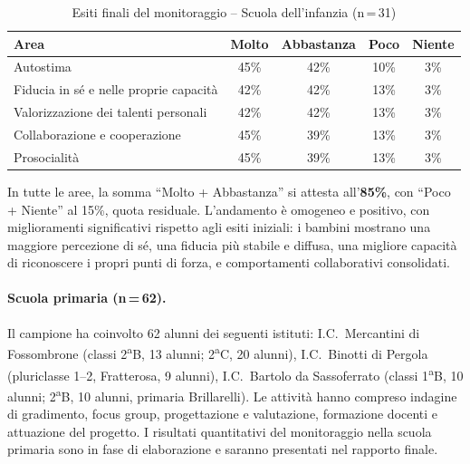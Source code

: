 \documentclass[12pt,a4paper]{article}
\begin{document}
\begin{table}[h]
\centering
\caption{Esiti finali del monitoraggio -- Scuola dell'infanzia (n\,=\,31)}
\label{tab:urbino_infanzia}
\begin{tabular}{lcccc}
\toprule
\textbf{Area} & \textbf{Molto} & \textbf{Abbastanza} & \textbf{Poco} & \textbf{Niente} \\
\midrule
Autostima & 45\% & 42\% & 10\% & 3\% \\
Fiducia in s\'e e nelle proprie capacit\`a & 42\% & 42\% & 13\% & 3\% \\
Valorizzazione dei talenti personali & 42\% & 42\% & 13\% & 3\% \\
Collaborazione e cooperazione & 45\% & 39\% & 13\% & 3\% \\
Prosocialit\`a & 45\% & 39\% & 13\% & 3\% \\
\bottomrule
\end{tabular}
\end{table}

In tutte le aree, la somma ``Molto + Abbastanza'' si attesta all'\textbf{85\%}, con ``Poco + Niente'' al 15\%, quota residuale. L'andamento \`e omogeneo e positivo, con miglioramenti significativi rispetto agli esiti iniziali: i bambini mostrano una maggiore percezione di s\'e, una fiducia pi\`u stabile e diffusa, una migliore capacit\`a di riconoscere i propri punti di forza, e comportamenti collaborativi consolidati.

\paragraph{Scuola primaria (n\,=\,62).} Il campione ha coinvolto 62 alunni dei seguenti istituti: I.C.\ Mercantini di Fossombrone (classi 2\textsuperscript{a}B, 13 alunni; 2\textsuperscript{a}C, 20 alunni), I.C.\ Binotti di Pergola (pluriclasse 1--2, Fratterosa, 9 alunni), I.C.\ Bartolo da Sassoferrato (classi 1\textsuperscript{a}B, 10 alunni; 2\textsuperscript{a}B, 10 alunni, primaria Brillarelli). Le attivit\`a hanno compreso indagine di gradimento, focus group, progettazione e valutazione, formazione docenti e attuazione del progetto. I risultati quantitativi del monitoraggio nella scuola primaria sono in fase di elaborazione e saranno presentati nel rapporto finale.
\end{document}
